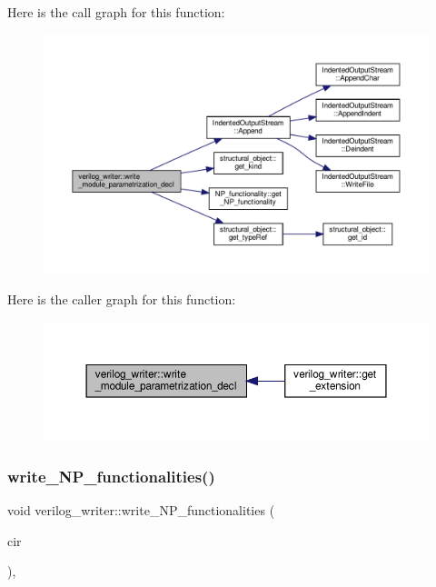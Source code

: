 Here is the call graph for this function\+:
\nopagebreak
\begin{figure}[H]
\begin{center}
\leavevmode
\includegraphics[width=350pt]{d8/dba/classverilog__writer_a429d09829b565c8bb4b243b0eb089546_cgraph}
\end{center}
\end{figure}
Here is the caller graph for this function\+:
\nopagebreak
\begin{figure}[H]
\begin{center}
\leavevmode
\includegraphics[width=350pt]{d8/dba/classverilog__writer_a429d09829b565c8bb4b243b0eb089546_icgraph}
\end{center}
\end{figure}
\mbox{\label{classverilog__writer_ab4539a1601893c0c86f57bb66da56e45}} 
\subsubsection{\texorpdfstring{write\+\_\+\+N\+P\+\_\+functionalities()}{write\_NP\_functionalities()}}
{\footnotesize\ttfamily void verilog\+\_\+writer\+::write\+\_\+\+N\+P\+\_\+functionalities (\begin{DoxyParamCaption}\item[{const \hyperlink{structural__objects_8hpp_a8ea5f8cc50ab8f4c31e2751074ff60b2}{structural\+\_\+object\+Ref} \&}]{cir }\end{DoxyParamCaption})\hspace{0.3cm}{\ttfamily [override]}, {\ttfamily [virtual]}}




